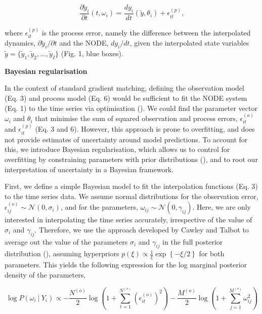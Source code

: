 \documentclass[11pt, oneside]{article}
\begin{document}
\vspace{-0.5cm}
\begin{equation}
    \frac{\partial \tilde{y}_i}{\partial t} (t, \omega_i) = \frac{dy_i}{dt} \left( \tilde{y},\theta_i \right) + \epsilon^{(p)}_{it},
\end{equation}

where $\epsilon^{(p)}_{it}$ is the process error, namely the difference between the interpolated dynamics, $\partial \tilde{y}_i/\partial t$ and the NODE, $dy_i/dt$, given the interpolated state variables $\tilde{y} = \{\tilde{y}_1,\tilde{y}_2, ...,\tilde{y}_I\}$ (Fig. 1, blue boxes). 

\textbf{Bayesian regularisation}

In the context of standard gradient matching, defining the observation model (Eq. 3) and process model (Eq. 6) would be sufficient to fit the NODE system (Eq. 1) to the time series via optimisation (\cite{Jost2000,Ellner2002,Wu2005}).
We could find the parameter vector $\omega_i$ and $\theta_i$ that minimise the sum of squared observation and process errors, $\epsilon_{it}^{(o)}$ and $\epsilon_{it}^{(p)}$ (Eq. 3 and 6).
However, this approach is prone to overfitting, and does not provide estimates of uncertainty around model predictions. 
To account for this, we introduce Bayesian regularisation, which allows us to control for overfitting by constraining parameters with prior distributions (\cite{Cawley2007}), and to root our interpretation of uncertainty in a Bayesian framework.

First, we define a simple Bayesian model to fit the interpolation functions (Eq. 3) to the time series data.
We assume normal distributions for the observation error, $\epsilon^{(o)}_{ij} \sim \mathcal{N}(0,\sigma_i)$, and for the parameters, $\omega_{ij} \sim \mathcal{N}(0,\gamma_{ij})$.
Here, we are only interested in interpolating the time series accurately, irrespective of the value of $\sigma_i$ and $\gamma_{ij}$.
Therefore, we use the approach developed by Cawley and Talbot to average out the value of the parameters $\sigma_i$ and $\gamma_{ij}$ in the full posterior distribution (\cite{Cawley2007}), assuming hyperpriors $p(\xi) \propto \frac{1}{\xi} \exp\left\{- \xi/2\right\}$ for both parameters.
This yields the following expression for the log marginal posterior density of the parameters,

\vspace{-0.5cm}
\begin{equation}
    \log P(\omega_i ~|~ Y_i) \propto - \frac{N^{(o)}}{2} \log \left(1 + \sum_{t=1}^{N^{(o)}} \left( \epsilon^{(o)}_{it} \right)^2 \right) - \frac{M^{(o)}}{2} \log \left(1 + \sum_{j=1}^{M^{(o)}} \omega_{ij}^2 \right)
\end{equation}
\end{document}
